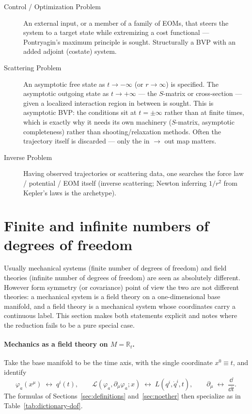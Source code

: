 \begin{description}
    \item [Control / Optimization Problem] An external input, or a member of a family of
  EOMs, that steers the system to a target state while extremizing a
  cost functional --- Pontryagin's maximum principle is sought.
   Structurally a BVP with an added adjoint (costate) system.

    \item [Scattering Problem] An asymptotic free state as $t \to
  -\infty$ (or $r \to \infty$) is specified.
   The asymptotic outgoing state as $t \to
  +\infty$ --- the $S$-matrix or cross-section --- given a localized
  interaction region in between is sought.
   This is asymptotic BVP: the conditions sit at $t = \pm\infty$ rather
   than at finite times, which   is exactly why it needs its own machinery 
   ($S$-matrix, asymptotic
  completeness) rather than shooting/relaxation methods.
 Often the trajectory itself is discarded --- only the
  in $\to$ out map matters.

    \item [Inverse Problem] Having observed trajectories or scattering data,
   one searches  the force law / potential / EOM itself
  (inverse scattering; Newton inferring $1/r^2$ from Kepler's laws is
  the archetype).
\end{description}

\section{Finite and infinite numbers of degrees of freedom}
\label{sec:dof}
Usually mechanical systems (finite number of degrees of freedom) 
and field theories (infinite number of degrees of freedom) are seen
as absolutely different. However form symmetry (or covariance) point
of view the two are
not different theories: a mechanical system is a field theory on a
one-dimensional base manifold, and a field theory is a mechanical system whose
coordinates carry a continuous label. This section makes both statements
explicit and notes where the reduction fails to be a pure special case.

\paragraph{Mechanics as a field theory on $M=\mathbb R_t$.}
Take the base manifold to be the time axis, with the single coordinate
$x^0\equiv t$, and identify
\begin{equation}\label{dictionary-id}
  \varphi_a(x^\mu)\;\leftrightarrow\;q^i(t),\qquad
  \mathcal L(\varphi_a,\partial_\mu\varphi_a;x)\;\leftrightarrow\;L(q^i,\dot q^i,t),\qquad
  \partial_\mu\;\leftrightarrow\;\frac{\dd}{\dd t}.
\end{equation}
The formulas of Sections~\ref{sec:definitions} and~\ref{sec:noether} then
specialize as in Table~\ref{tab:dictionary-dof}.

